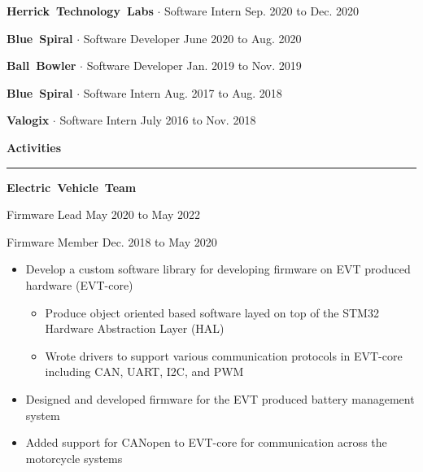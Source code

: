 \documentclass{article}
\newcommand{\rSection}[1] {
  \textcolor{header-blue} {
    \textbf{{\fontsize{0.5cm}{0.45cm}\selectfont \hbox{#1}}} \\
    \rule{0.30\textwidth}{0.1cm}
  }
}
\newcommand{\rSubSubSection}[1] {
  \textbf{{\fontsize{0.35cm}{0.45cm}\selectfont \hbox{#1}}}
}
\begin{document}
\rSubSubSection{Herrick Technology Labs} $ \cdot $ Software Intern \hfill Sep. 2020 to Dec. 2020 \par
\vspace{-10pt}
    
\vspace{-10pt}

\rSubSubSection{Blue Spiral} $ \cdot $ Software Developer \hfill June 2020 to Aug. 2020 \par
\vspace{-10pt}
    
\vspace{-10pt}

\rSubSubSection{Ball Bowler} $ \cdot $ Software Developer \hfill Jan. 2019 to Nov. 2019 \par
\vspace{-10pt}
    
\vspace{-10pt}

\rSubSubSection{Blue Spiral} $ \cdot $ Software Intern \hfill Aug. 2017 to Aug. 2018 \par
\vspace{-10pt}
    
\vspace{-10pt}

\rSubSubSection{Valogix} $ \cdot $ Software Intern \hfill July 2016 to Nov. 2018 \par
\vspace{-10pt}
    
\vspace{-10pt}

\rSection{Activities} \par

\rSubSubSection{Electric Vehicle Team}\par
Firmware Lead \hfill May 2020 to May 2022 \par
Firmware Member \hfill Dec. 2018 to May 2020
\vspace{-10pt}
\begin{itemize}
    \setlength\itemsep{0pt}
    \setlength{\parskip}{0pt}
    \item Develop a custom software library for developing firmware on EVT produced hardware (EVT-core)
    \begin{itemize}
        \setlength\itemsep{0pt}
        \setlength{\parskip}{0pt}
        \item Produce object oriented based software layed on top of the STM32 Hardware Abstraction Layer (HAL)
        \item Wrote drivers to support various communication protocols in EVT-core including CAN, UART, I2C, and PWM
    \end{itemize}
    \item Designed and developed firmware for the EVT produced battery management system
    \item Added support for CANopen to EVT-core for communication across the motorcycle systems
\end{itemize}
\vspace{-10pt}
\end{document}
